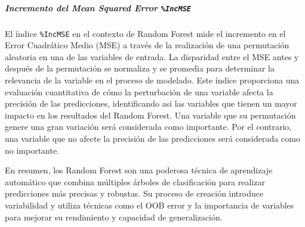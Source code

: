 \subparagraph{Incremento del Mean Squared Error  \texttt{\%IncMSE}}

El índice \texttt{\%IncMSE} en el contexto de Random Forest mide el incremento en el Error Cuadrático Medio (MSE) a través de la realización de una permutación aleatoria en una de las variables de entrada. La disparidad entre el MSE antes y después de la permutación se normaliza y se promedia para determinar la relevancia de la variable en el proceso de modelado. Este índice proporciona una evaluación cuantitativa de cómo la perturbación de una variable afecta la precisión de las predicciones, identificando así las variables que tienen un mayor impacto en los resultados del Random Forest. Una variable que su permutación genere una gran variación será considerada como importante. Por el contrario, una variable que no afecte la precisión de las predicciones será considerada como no importante.

En resumen, los Random Forest son una poderosa técnica de aprendizaje automático que combina múltiples árboles de clasificación para realizar predicciones más precisas y robustas. Su proceso de creación introduce variabilidad y utiliza técnicas como el OOB error y la importancia de variables para mejorar su rendimiento y capacidad de generalización.
